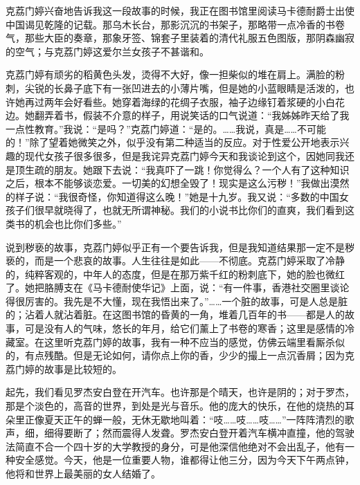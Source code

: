 \par 克荔门婷兴奋地告诉我这一段故事的时候，我正在图书馆里阅读马卡德耐爵士出使中国谒见乾隆的记载。那乌木长台，那影沉沉的书架子，那略带一点冷香的书卷气，那些大臣的奏章，那象牙签、锦套子里装着的清代礼服五色图版，那阴森幽寂的空气；与克荔门婷这爱尔兰女孩子不甚谐和。
\par 克荔门婷有顽劣的稻黄色头发，烫得不大好，像一担柴似的堆在肩上。满脸的粉刺，尖锐的长鼻子底下有一张凹进去的小薄片嘴，但是她的小蓝眼睛是活泼的，也许她再过两年会好看些。她穿着海绿的花绸子衣服，袖子边缘钉着浆硬的小白花边。她翻弄着书，假装不介意的样子，用说笑话的口气说道：“我姊姊昨天给了我一点性教育。”我说：“是吗？”克荔门婷道：“是的。……我说，真是……不可能的！”除了望着她微笑之外，似乎没有第二种适当的反应。对于性爱公开地表示兴趣的现代女孩子很多很多，但是我诧异克荔门婷今天和我谈论到这个，因她同我还是顶生疏的朋友。她跟下去说：“我真吓了一跳！你觉得么？一个人有了这种知识之后，根本不能够谈恋爱。一切美的幻想全毁了！现实是这么污秽！”我做出漠然的样子说：“我很奇怪，你知道得这么晚！”她是十九岁。我又说：“多数的中国女孩子们很早就晓得了，也就无所谓神秘。我们的小说书比你们的直爽，我们看到这类书的机会也比你们多些。”
\par 说到秽亵的故事，克荔门婷似乎正有一个要告诉我，但是我知道结果那一定不是秽亵的，而是一个悲哀的故事。人生往往是如此——不彻底。克荔门婷采取了冷静的，纯粹客观的，中年人的态度，但是在那万紫千红的粉刺底下，她的脸也微红了。她把胳膊支在《马卡德耐使华记》上面，说：“有一件事，香港社交圈里谈论得很厉害的。我先是不大懂，现在我悟出来了。”……一个脏的故事，可是人总是脏的；沾着人就沾着脏。在这图书馆的昏黄的一角，堆着几百年的书——都是人的故事，可是没有人的气味，悠长的年月，给它们薰上了书卷的寒香；这里是感情的冷藏室。在这里听克荔门婷的故事，我有一种不应当的感觉，仿佛云端里看厮杀似的，有点残酷。但是无论如何，请你点上你的香，少少的撮上一点沉香屑；因为克荔门婷的故事是比较短的。
\par 起先，我们看见罗杰安白登在开汽车。也许那是个晴天，也许是阴的；对于罗杰，那是个淡色的，高音的世界，到处是光与音乐。他的庞大的快乐，在他的烧热的耳朵里正像夏天正午的蝉一般，无休无歇地叫着：“吱……吱……吱……”一阵阵清烈的歌声，细，细得要断了；然而震得人发聋。罗杰安白登开着汽车横冲直撞，他的驾驶法简直不合一个四十岁的大学教授的身分，可是他深信他绝对不会出乱子，他有一种安全感觉。今天，他是一位重要人物，谁都得让他三分，因为今天下午两点钟，他将和世界上最美丽的女人结婚了。
